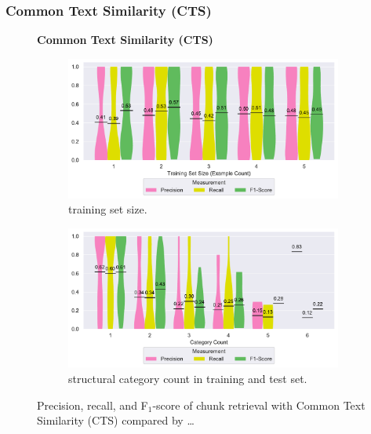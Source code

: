 \subsubsection{Common Text Similarity (CTS)}
\label{sec:r:cts}

\begin{figure}
\centering
    \textbf{Common Text Similarity (CTS)}\par\medskip
\begin{subfigure}[tb]{\columnwidth}
		\centering
		\includegraphics[width=\columnwidth,
		clip]{img/big-study/recall-precision-examplecount-CTS.pdf}
		\caption{training set size.}
		\label{fig:recall-precision-examplecount-CTS}

\end{subfigure}\hspace{\fill}
\begin{subfigure}[tb]{\columnwidth}
		\centering
				\includegraphics[width=\columnwidth,
				clip]{img/big-study/recall-precision-categorycount-CTS.pdf}
		\caption{structural category count
		in training and test set.}
		\label{fig:recall-precision-categorycount-CTS}
\end{subfigure}
\caption{Precision, recall, and F$_{1}$-score of chunk
retrieval with Common Text Similarity (CTS) compared by \ldots}
\label{fig:results-CTS}
\end{figure}

